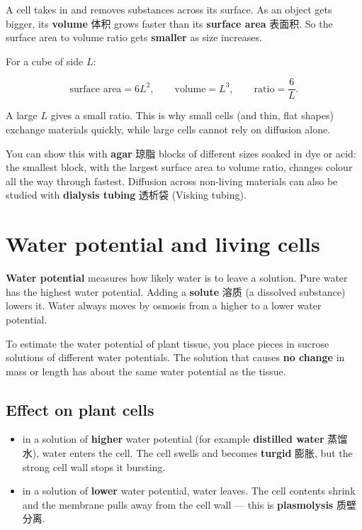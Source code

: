 \documentclass[11pt]{article}
\begin{document}
A cell takes in and removes substances across its surface. As an object gets bigger, its \textbf{volume} 体积 grows faster than its \textbf{surface area} 表面积. So the surface area to volume ratio gets \textbf{smaller} as size increases.

For a cube of side $L$:

\[
\text{surface area} = 6L^2, \qquad \text{volume} = L^3, \qquad \text{ratio} = \frac{6}{L}.
\]

A large $L$ gives a small ratio. This is why small cells (and thin, flat shapes) exchange materials quickly, while large cells cannot rely on diffusion alone.

You can show this with \textbf{agar} 琼脂 blocks of different sizes soaked in dye or acid: the smallest block, with the largest surface area to volume ratio, changes colour all the way through fastest. Diffusion across non-living materials can also be studied with \textbf{dialysis tubing} 透析袋 (Visking tubing).

\section*{Water potential and living cells}

\textbf{Water potential} measures how likely water is to leave a solution. Pure water has the highest water potential. Adding a \textbf{solute} 溶质 (a dissolved substance) lowers it. Water always moves by osmosis from a higher to a lower water potential.

To estimate the water potential of plant tissue, you place pieces in sucrose solutions of different water potentials. The solution that causes \textbf{no change} in mass or length has about the same water potential as the tissue.

\subsection*{Effect on plant cells}

\begin{itemize}
\item in a solution of \textbf{higher} water potential (for example \textbf{distilled water} 蒸馏水), water enters the cell. The cell swells and becomes \textbf{turgid} 膨胀, but the strong cell wall stops it bursting.

\item in a solution of \textbf{lower} water potential, water leaves. The cell contents shrink and the membrane pulls away from the cell wall — this is \textbf{plasmolysis} 质壁分离.

\end{itemize}
\end{document}
